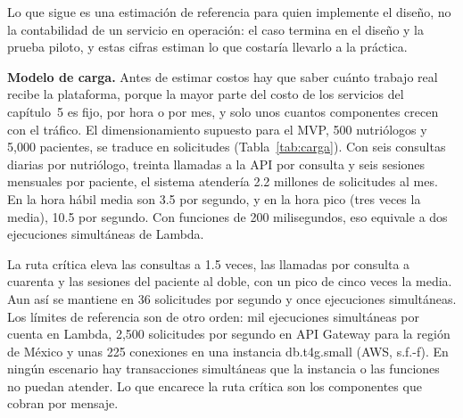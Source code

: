 \documentclass[12pt, a4paper]{article}
\begin{document}
Lo que sigue es una estimación de referencia para quien implemente el
diseño, no la contabilidad de un servicio en operación: el caso termina
en el diseño y la prueba piloto, y estas cifras estiman lo que costaría
llevarlo a la práctica.
 
\textbf{Modelo de carga.} Antes de estimar costos hay que saber cuánto
trabajo real recibe la plataforma, porque la mayor parte del costo de
los servicios del capítulo~5 es fijo, por hora o por mes, y solo unos
cuantos componentes crecen con el tráfico. El dimensionamiento supuesto
para el MVP, 500 nutriólogos y 5,000 pacientes, se traduce en
solicitudes (Tabla~\ref{tab:carga}). Con seis consultas diarias por
nutriólogo, treinta llamadas a la API por consulta y seis sesiones
mensuales por paciente, el sistema atendería 2.2 millones de solicitudes
al mes. En la hora hábil media son 3.5 por segundo, y en la hora pico
(tres veces la media), 10.5 por segundo. Con funciones de 200
milisegundos, eso equivale a dos ejecuciones simultáneas de Lambda.

La ruta crítica eleva las consultas a 1.5 veces, las llamadas por
consulta a cuarenta y las sesiones del paciente al doble, con un pico de
cinco veces la media. Aun así se mantiene en 36 solicitudes por segundo
y once ejecuciones simultáneas. Los límites de referencia son de otro
orden: mil ejecuciones simultáneas por cuenta en Lambda, 2,500
solicitudes por segundo en API Gateway para la región de México y unas
225 conexiones en una instancia db.t4g.small (AWS, s.f.-f). En ningún
escenario hay transacciones simultáneas que la instancia o las funciones
no puedan atender. Lo que encarece la ruta crítica son los componentes
que cobran por mensaje.
 
\end{document}
